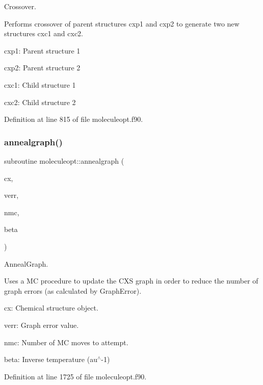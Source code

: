 Crossover. 

Performs crossover of parent structures cxp1 and cxp2 to generate two new structures cxc1 and cxc2.


\begin{DoxyItemize}
\item cxp1\+: Parent structure 1
\item cxp2\+: Parent structure 2
\item cxc1\+: Child structure 1
\item cxc2\+: Child structure 2 
\end{DoxyItemize}

Definition at line 815 of file moleculeopt.\+f90.

\mbox{\label{namespacemoleculeopt_a67034fd87b4f496aa1bde12b85dcce96}} 
\subsubsection{\texorpdfstring{annealgraph()}{annealgraph()}}
{\footnotesize\ttfamily subroutine moleculeopt\+::annealgraph (\begin{DoxyParamCaption}\item[{type(\mbox{\hyperlink{structchemstr_1_1cxs}{cxs}})}]{cx,  }\item[{real(8)}]{verr,  }\item[{integer}]{nmc,  }\item[{real(8)}]{beta }\end{DoxyParamCaption})}



Anneal\+Graph. 

Uses a MC procedure to update the C\+XS graph in order to reduce the number of graph errors (as calculated by Graph\+Error).


\begin{DoxyItemize}
\item cx\+: Chemical structure object.
\item verr\+: Graph error value.
\item nmc\+: Number of MC moves to attempt.
\item beta\+: Inverse temperature (au$^\wedge$-\/1) 
\end{DoxyItemize}

Definition at line 1725 of file moleculeopt.\+f90.

\mbox{\label{namespacemoleculeopt_a112aaf632abf4b6e00b4a17247145342}} 
